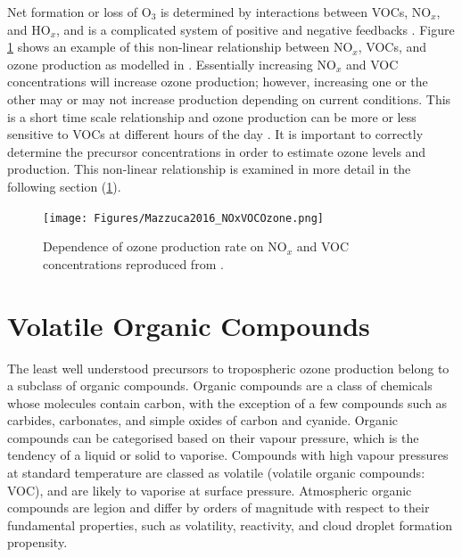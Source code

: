     
    Net formation or loss of O$_3$ is determined by interactions between VOCs, 
    NO$_x$, and HO$_x$, and is a complicated system of positive and negative 
    feedbacks \parencite{Atkinson2000}.
    Figure \ref{LR:VOCs:fig_NOXVOCOzone} shows an example of this non-linear relationship between NO$_x$, VOCs, and ozone production as modelled in \textcite{Mazzuca2016}.
    Essentially increasing NO$_x$ and VOC concentrations will increase ozone production; however, increasing one or the other may or may not increase production depending on current conditions.
    This is a short time scale relationship and ozone production can be more or less sensitive to VOCs at different hours of the day \parencite{Mazzuca2016}.
    It is important to correctly determine the precursor concentrations in 
    order to estimate ozone levels and production.
    This non-linear relationship is examined in more detail in the following section (\ref{LR:VOCs}).
    
    \begin{figure}
      \texttt{[image: Figures/Mazzuca2016\_NOxVOCOzone.png]}
      \caption{Dependence of ozone production rate on NO$_x$ and VOC 
      concentrations reproduced from \textcite{Mazzuca2016}.}
      \label{LR:VOCs:fig_NOXVOCOzone}
    \end{figure}
    
    
\section{Volatile Organic Compounds}
\label{LR:VOCs}

  The least well understood precursors to tropospheric ozone production belong to a subclass of organic compounds.
  Organic compounds are a class of chemicals whose molecules contain carbon, with the exception of a few compounds such as carbides, carbonates, and simple oxides of carbon and cyanide.
  Organic compounds can be categorised based on their vapour pressure, which is the tendency of a liquid or solid to vaporise.
  Compounds with high vapour pressures at standard temperature are classed as volatile (volatile organic compounds: VOC), and are likely to vaporise at surface pressure.
  Atmospheric organic compounds are legion and differ by orders of magnitude with respect to their fundamental properties, such as volatility, reactivity, and cloud droplet formation propensity.
  
